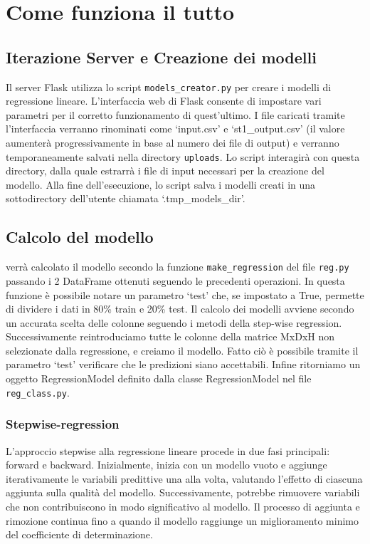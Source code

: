 \documentclass[a4paper,10pt]{article}
\begin{document}
\section{Come funziona il tutto}

\subsection{Iterazione Server e Creazione dei modelli}

Il server Flask utilizza lo script \texttt{models\_creator.py} per creare i modelli di regressione lineare. L'interfaccia web di Flask consente
di impostare vari parametri per il corretto funzionamento di quest'ultimo.
I file caricati tramite l'interfaccia verranno rinominati come `input.csv' e `st1\_output.csv' (il valore aumenterà progressivamente in base al numero dei file di output)
e verranno temporaneamente salvati nella directory \texttt{uploads}.
Lo script interagirà con questa directory, dalla quale estrarrà i file di input necessari per la creazione del modello.
Alla fine dell'esecuzione, lo script salva i modelli creati in una sottodirectory dell'utente chiamata `.tmp\_models\_dir'.

\subsection{Calcolo del modello}
verrà calcolato il modello secondo la funzione \texttt{make\_regression} del file \texttt{reg.py} passando i 2 DataFrame ottenuti seguendo le precedenti operazioni.
In questa funzione è possibile notare un parametro `test' che, se impostato a True, permette di dividere i dati in 80\% train e 20\% test. Il calcolo dei modelli
avviene secondo un accurata scelta delle colonne seguendo i metodi della step-wise regression. 
Successivamente reintroduciamo tutte le colonne della matrice MxDxH non selezionate dalla regressione, e creiamo il modello. 
Fatto ciò è possibile tramite il parametro `test' verificare che le predizioni siano accettabili. Infine ritorniamo un oggetto RegressionModel definito 
dalla classe RegressionModel nel file \texttt{reg\_class.py}.

\subsubsection{Stepwise-regression}
L'approccio stepwise alla regressione lineare procede in due fasi principali: forward e backward. Inizialmente, inizia con un modello vuoto e 
aggiunge iterativamente le variabili predittive una alla volta, valutando l'effetto di ciascuna aggiunta sulla qualità del modello. 
Successivamente, potrebbe rimuovere variabili che non contribuiscono in modo significativo al modello.
Il processo di aggiunta e rimozione continua fino a quando il modello raggiunge un miglioramento minimo del coefficiente di determinazione.
\end{document}
